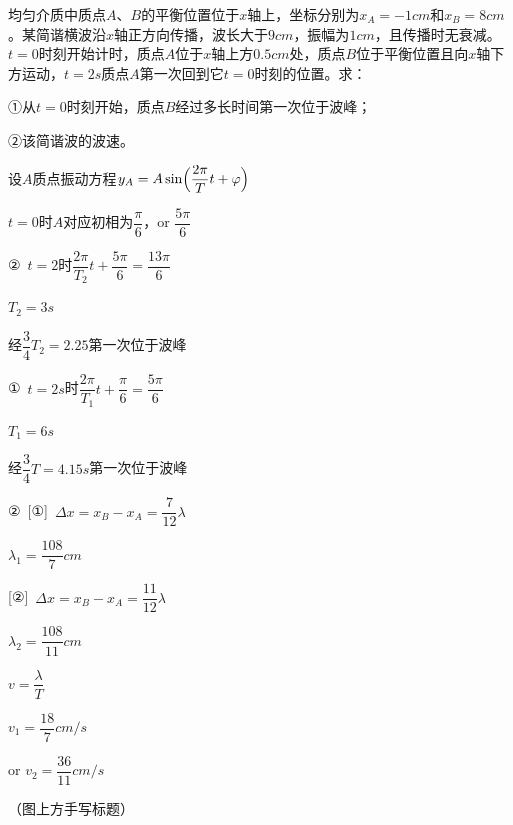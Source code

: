 \begin{problem}[10分]
均匀介质中质点$A$、$B$的平衡位置位于$x$轴上，坐标分别为$x_A=-1\unit{cm}$和$x_B=8\unit{cm}$。某简谐横波沿$x$轴正方向传播，波长大于$9\unit{cm}$，振幅为$1\unit{cm}$，且传播时无衰减。$t=0$时刻开始计时，质点$A$位于$x$轴上方$0.5\unit{cm}$处，质点$B$位于平衡位置且向$x$轴下方运动，$t=2\unit{s}$质点$A$第一次回到它$t=0$时刻的位置。求：

①从$t=0$时刻开始，质点$B$经过多长时间第一次位于波峰；

②该简谐波的波速。
\begin{solution}
设$A$质点振动方程\quad $y_A=A\sin\Bigl(\dfrac{2\pi}{T}t+\varphi\Bigr)$

$t=0$时$A$对应初相为$\dfrac{\pi}{6}$，or $\dfrac{5\pi}{6}$

②\ $t=2$时\quad $\dfrac{2\pi}{T_2}t+\dfrac{5\pi}{6}=\dfrac{13\pi}{6}$

$T_2=3\unit{s}$

经$\dfrac{3}{4}T_2=2.25$第一次位于波峰

①\ $t=2\unit{s}$时\quad $\dfrac{2\pi}{T_1}t+\dfrac{\pi}{6}=\dfrac{5\pi}{6}$

$T_1=6\unit{s}$

经$\dfrac{3}{4}T=4.15\unit{s}$第一次位于波峰%

②\ [①]\ $\Delta x=x_B-x_A=\dfrac{7}{12}\lambda$

$\lambda_1=\dfrac{108}{7}\unit{cm}$

[②]\ $\Delta x=x_B-x_A=\dfrac{11}{12}\lambda$

$\lambda_2=\dfrac{108}{11}\unit{cm}$

$v=\dfrac{\lambda}{T}$

$v_1=\dfrac{18}{7}\unit{cm/s}$

or $v_2=\dfrac{36}{11}\unit{cm/s}$
\end{solution}
\end{problem}
（图上方手写标题）


